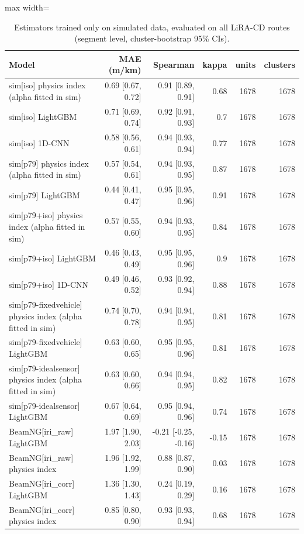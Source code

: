 \begin{table}[!htbp]
\centering
\footnotesize
\caption{Estimators trained only on simulated data, evaluated on all LiRA-CD routes (segment level, cluster-bootstrap 95\% CIs).}
\label{tab:tableS_zeroshot_full}
\begin{adjustbox}{max width=\columnwidth}
\begin{tabular}{lrrrrr}
\toprule
\textbf{Model} & \textbf{MAE (m/km)} & \textbf{Spearman} & \textbf{kappa} & \textbf{units} & \textbf{clusters} \\
\midrule
sim[iso] physics index (alpha fitted in sim) & 0.69 [0.67, 0.72] & 0.91 [0.89, 0.91] & 0.68 & 1678 & 1678 \\
sim[iso] LightGBM & 0.71 [0.69, 0.74] & 0.92 [0.91, 0.93] & 0.7 & 1678 & 1678 \\
sim[iso] 1D-CNN & 0.58 [0.56, 0.61] & 0.94 [0.93, 0.94] & 0.77 & 1678 & 1678 \\
sim[p79] physics index (alpha fitted in sim) & 0.57 [0.54, 0.61] & 0.94 [0.93, 0.95] & 0.87 & 1678 & 1678 \\
sim[p79] LightGBM & 0.44 [0.41, 0.47] & 0.95 [0.95, 0.96] & 0.91 & 1678 & 1678 \\
sim[p79+iso] physics index (alpha fitted in sim) & 0.57 [0.55, 0.60] & 0.94 [0.93, 0.95] & 0.84 & 1678 & 1678 \\
sim[p79+iso] LightGBM & 0.46 [0.43, 0.49] & 0.95 [0.95, 0.96] & 0.9 & 1678 & 1678 \\
sim[p79+iso] 1D-CNN & 0.49 [0.46, 0.52] & 0.93 [0.92, 0.94] & 0.88 & 1678 & 1678 \\
sim[p79-fixedvehicle] physics index (alpha fitted in sim) & 0.74 [0.70, 0.78] & 0.94 [0.94, 0.95] & 0.81 & 1678 & 1678 \\
sim[p79-fixedvehicle] LightGBM & 0.63 [0.60, 0.65] & 0.95 [0.95, 0.96] & 0.81 & 1678 & 1678 \\
sim[p79-idealsensor] physics index (alpha fitted in sim) & 0.63 [0.60, 0.66] & 0.94 [0.94, 0.95] & 0.82 & 1678 & 1678 \\
sim[p79-idealsensor] LightGBM & 0.67 [0.64, 0.69] & 0.95 [0.94, 0.96] & 0.74 & 1678 & 1678 \\
BeamNG[iri\_raw] LightGBM & 1.97 [1.90, 2.03] & -0.21 [-0.25, -0.16] & -0.15 & 1678 & 1678 \\
BeamNG[iri\_raw] physics index & 1.96 [1.92, 1.99] & 0.88 [0.87, 0.90] & 0.03 & 1678 & 1678 \\
BeamNG[iri\_corr] LightGBM & 1.36 [1.30, 1.43] & 0.24 [0.19, 0.29] & 0.16 & 1678 & 1678 \\
BeamNG[iri\_corr] physics index & 0.85 [0.80, 0.90] & 0.93 [0.93, 0.94] & 0.68 & 1678 & 1678 \\
\bottomrule
\end{tabular}
\end{adjustbox}
\end{table}
